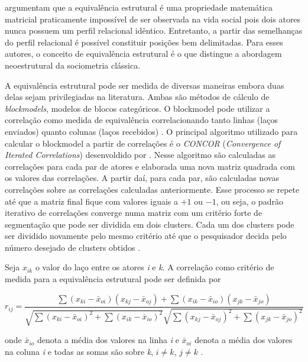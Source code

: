 \documentclass[a4paper, 12pt, openright, oneside, german, french, english, brazil]{abntex2}
\begin{document}
	 argumentam que a equivalência estrutural é uma propriedade matemática matricial praticamente impossível de ser observada na vida social pois dois atores nunca possuem um perfil relacional idêntico. Entretanto, a partir das semelhanças do perfil relacional é possível constituir posições bem delimitadas. Para esses autores, o conceito de equivalência estrutural é o que distingue a abordagem neoestrutural da sociometria clássica.
	
	A equivalência estrutural pode ser medida de diversas maneiras embora duas delas sejam privilegiadas na literatura. Ambas são métodos de cálculo de \textit{blockmodels}, modelos de blocos categóricos. O blockmodel pode utilizar a correlação como medida de equivalência correlacionando tanto linhas (laços enviados) quanto colunas (laços recebidos) \cite{lazega2014redes}. O principal algoritmo utilizado para calcular o blockmodel a partir de correlações é o \textit{CONCOR} (\textit{Convergence of Iterated Correlations}) desenvoldido por . Nesse algoritmo são calculadas as correlações para cada par de atores e elaborada uma nova matriz quadrada com os valores das correlações. A partir daí, para cada par, são calculadas novas correlações sobre as correlações calculadas anteriormente. Esse processo se repete até que a matriz final fique com valores iguais a $+1$ ou $-1$, ou seja, o padrão iterativo de correlações converge numa matriz com um critério forte de segmentação que pode ser dividida em dois clusters. Cada um dos clusters pode ser dividido novamente pelo mesmo critério até que o pesquisador decida pelo número desejado de clusters obtidos \cite{scott2017social}.
	
	Seja $x_{ik}$ o valor do laço entre os atores \textit{i} e \textit{k}. A correlação como critério de medida para a equivalência estrutural pode ser definida por
	
	\begin{equation}
	r_{ij} = \frac{\sum(x_{ki} - \bar{x}_{oi})(x_{kj} - \bar{x}_{oj}) + \sum(x_{ik} - \bar{x}_{io})(x_{jk} - \bar{x}_{jo})}{\sqrt{ \sum(x_{ki} - \bar{x}_{oi})^2 + \sum(x_{ik} - \bar{x}_{io})^2} \sqrt{\sum(x_{kj} - \bar{x}_{oj})^2 + \sum(x_{jk} - \bar{x}_{jo})^2}}
	\end{equation}
	
	onde $\bar{x}_{io}$ denota a média dos valores na linha \textit{i} e $\bar{x}_{oi}$ denota a média dos valores na coluna \textit{i} e todas as somas são sobre \textit{k}, $i \neq k$, $j \neq k$ \cite{wasserman1994social}.
	
\end{document}
